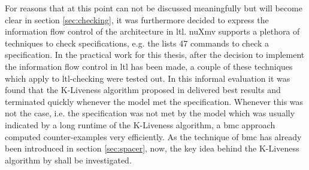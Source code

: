 For reasons that at this point can not be discussed meaningfully but will become clear in section \ref{sec:checking}, it was furthermore decided to express the information flow control of the architecture in \gls{ltl}.
nuXmv supports a plethora of techniques to check specifications, e.g. the  \cite{nuXmv} lists 47 commands to check a specification.
In the practical work for this thesis, after the decision to implement the information flow control in \gls{ltl} has been made, a couple of these techniques which apply to \gls{ltl}-checking were tested out.
In this informal evaluation it was found that the K-Liveness algorithm proposed in \cite{Claessen12} delivered best results and terminated quickly whenever the model met the specification.
Whenever this was not the case, i.e. the specification was not met by the model which was usually indicated by a long runtime of the K-Liveness algorithm, a \gls{bmc} approach computed counter-examples very efficiently.
As the technique of \gls{bmc} has already been introduced in section \ref{sec:spacer}, now, the key idea behind the K-Liveness algorithm by \citeauthor{Claessen12} shall be investigated.

